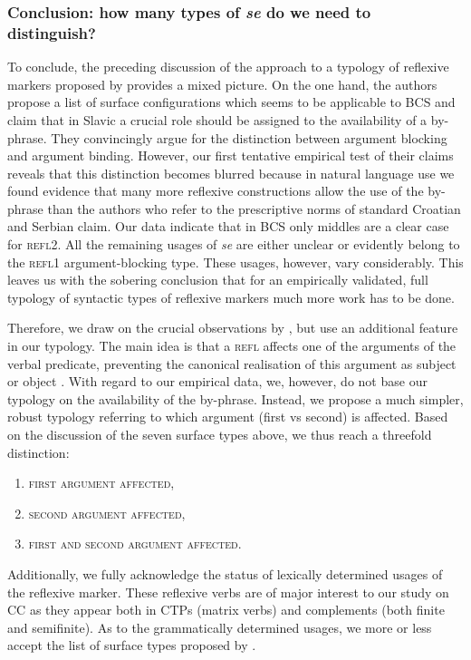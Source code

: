 \subsubsection{Conclusion: how many types of \textit{se} do we need to distinguish?}
\label{Conclusion: how many types of se do we need to distinguish?}
To conclude, the preceding discussion of the approach to a typology of reflexive markers proposed by \citet[228]{FJL10} provides a mixed picture. On the one hand, the authors propose a list of surface configurations which seems to be applicable to BCS and claim that in Slavic a crucial role should be assigned to the availability of a by-phrase. They convincingly argue for the distinction between argument blocking and argument binding. However, our first tentative empirical test of their claims reveals that this distinction becomes blurred because in natural language use we found evidence that many more reflexive constructions allow the use of the by-phrase than the authors who refer to the prescriptive norms of standard Croatian and Serbian claim. Our data indicate that in BCS only middles are a clear case for \textsc{refl2}. All the remaining usages of \textit{se} are either unclear or evidently belong to the \textsc{refl1} argument-blocking type. These usages, however, vary considerably. This leaves us with the sobering conclusion that for an empirically validated, full typology of syntactic types of reflexive markers much more work has to be done. 

Therefore, we draw on the crucial observations by \citet{FJL10}, but use an additional feature in our typology. The main idea is that a \textsc{refl} affects one of the arguments of the verbal predicate, preventing the canonical realisation of this argument as subject or object \citep[218]{FJL10}. With regard to our empirical data, we, however, do not base our typology on the availability of the by-phrase. Instead, we propose a much simpler, robust typology referring to which argument (first vs second) is affected. Based on the discussion of the seven surface types above, we thus reach a threefold distinction:

\begin{enumerate}
	\item \textsc{first argument affected},
	\item \textsc{second argument affected},
	\item \textsc{first and second argument affected}.
\end{enumerate}

Additionally, we fully acknowledge the status of lexically determined usages of the reflexive marker. These reflexive verbs are of major interest to our study on CC as they appear both in CTPs (matrix verbs) and complements (both finite and semifinite). As to the grammatically determined usages, we more or less accept the list of surface types proposed by \citet{FJL10}.

